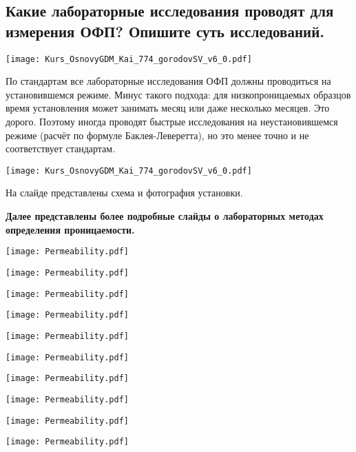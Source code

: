 

\subsection{Какие лабораторные исследования проводят для измерения ОФП? Опишите суть исследований.}

\texttt{[image: Kurs\_OsnovyGDM\_Kai\_774\_gorodovSV\_v6\_0.pdf]}

По стандартам все лабораторные исследования ОФП должны проводиться на установившемся режиме.
Минус такого подхода: для низкопроницаемых образцов время установления может занимать месяц или даже несколько месяцев.
Это дорого.
Поэтому иногда проводят быстрые исследования на неустановившемся режиме (расчёт по формуле Баклея-Леверетта), но это менее точно и не соответствует стандартам.

\texttt{[image: Kurs\_OsnovyGDM\_Kai\_774\_gorodovSV\_v6\_0.pdf]}

На слайде представлены схема и фотография установки.


\textbf{Далее представлены более подробные слайды о лабораторных методах определения проницаемости.}

\texttt{[image: Permeability.pdf]}

\texttt{[image: Permeability.pdf]}

\texttt{[image: Permeability.pdf]}

\texttt{[image: Permeability.pdf]}

\texttt{[image: Permeability.pdf]}

\texttt{[image: Permeability.pdf]}

\texttt{[image: Permeability.pdf]}

\texttt{[image: Permeability.pdf]}

\texttt{[image: Permeability.pdf]}

\texttt{[image: Permeability.pdf]}

